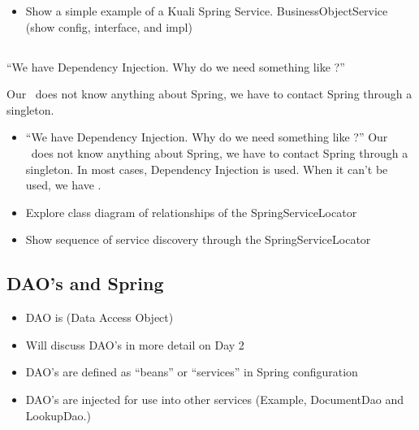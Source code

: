 \begin{ifhtml}
\begin{s5slide}
    \begin{s5notes}
      \begin{itemize}
        \item Show a simple example of a Kuali Spring Service. BusinessObjectService (show config, interface, and impl)
      \end{itemize}
    \end{s5notes} 
  \end{s5slide}

  \begin{s5slide}
    \section{}
    ``We have Dependency Injection. Why do we need something like ?'' 

    Our \MVC \ does not know anything about Spring, we have to contact Spring through a singleton. 

    \begin{s5notes}
      \begin{itemize}
        \item ``We have Dependency Injection. Why do we need something like ?'' Our \MVC \ does not know 
          anything about Spring, we have to contact Spring through a singleton. In most cases, Dependency Injection is used. When 
          it can't be used, we have .
        \item Explore class diagram of relationships of the SpringServiceLocator
        \item Show sequence of service discovery through the SpringServiceLocator
      \end{itemize}
    \end{s5notes} 
  \end{s5slide}

  \begin{s5slide}
    \section{DAO's and Spring}
    \begin{itemize}
      \item DAO is (Data Access Object)
      \item Will discuss DAO's in more detail on Day 2
      \item DAO's are defined as ``beans'' or ``services'' in Spring configuration
      \item DAO's are injected for use into other services (Example, DocumentDao and LookupDao.)
    \end{itemize}


\end{s5slide}
\end{ifhtml}
